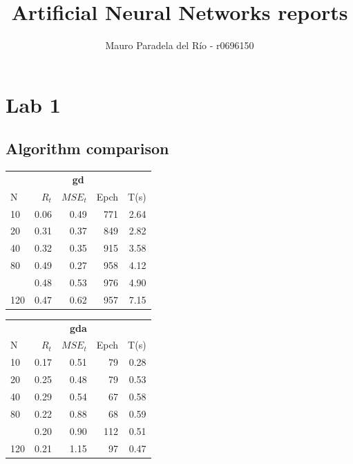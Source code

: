 \documentclass[a4paper, 10pt]{article}
\title{Artificial Neural Networks reports}
\author{Mauro Paradela del Río - r0696150}
\date{}
\begin{document}
\maketitle
\newpage
\section{Lab 1}
  \subsection{Algorithm comparison}
  \begin{table}[h!]
    \begin{tabular}{@{}lrrrr@{}}
      \toprule
      \multicolumn{5}{c}{\textbf{gd}} \\
      N  &   $R_t$  &  $MSE_t$ &  Epch  & T(s)\\
      \midrule
      10       &   0.06     &  0.49       &  771     & 2.64   \\
      20       &   0.31     &  0.37       &  849     & 2.82   \\
      40       &   0.32     &  0.35       &  915     & 3.58   \\
      80       &   0.49     &  0.27       &  958     & 4.12   \\
      \hdashline
      100      &   0.48     &  0.53       &  976     & 4.90   \\
      120      &   0.47     &  0.62       &  957     & 7.15   \\
      \bottomrule
    \end{tabular} 
    \hfill
    \begin{tabular}{@{}lrrrr@{}}
      \toprule
      \multicolumn{5}{c}{\textbf{gda}} \\
      N  &   $R_t$  &  $MSE_t$ &  Epch  & T(s)\\
      \midrule
      10  & 0.17    & 0.51    & 79      &  0.28   \\
      20  & 0.25    & 0.48    & 79      &  0.53   \\
      40  & 0.29    & 0.54    & 67      &  0.58   \\
      80  & 0.22    & 0.88    & 68      &  0.59   \\                 
      \hdashline
      100 & 0.20    & 0.90    & 112     &  0.51   \\
      120 & 0.21    & 1.15    & 97      &  0.47   \\
      \bottomrule
    \end{tabular} 
    \hfill
    \begin{tabular}{@{}lrrrr@{}}

\end{tabular}
\end{table}
\end{document}
